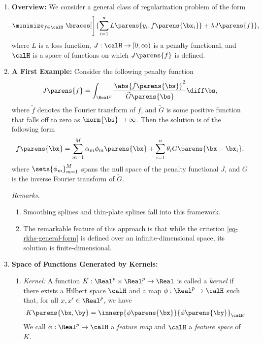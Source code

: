 \documentclass[12pt]{article}
\begin{document}
\begin{enumerate}[label=\textbf{\arabic*.}]

	\item \textbf{Overview:} We consider a general class of regularization problem of the form 
	\begin{align}\label{eq-rkhs-general-form}
		\minimize_{f \in \calH} \ \braces[\Bigg]{ \sum_{i=1}^n L \parens{y_i, f \parens{\bx_i} } + \lambda J \parens{f} }, 
	\end{align}
	where $L$ is a loss function, $J: \calH \to [0, \infty)$ is a penalty functional, and $\calH$ is a space of functions on which $J \parens{f}$ is defined. 
	
	\item \textbf{A First Example:} Consider the following penalty function 
	\begin{align*}
		J \parens{f} = \int_{\Real^p} \frac{\abs{\tilde{f} \parens{\bs}}^2}{\widetilde{G} \parens{\bs}} \diff \bs, 
	\end{align*}
	where $\tilde{f}$ denotes the Fourier transform of $f$, and $\widetilde{G}$ is some positive function that falls off to zero as $\norm{\bs} \to \infty$. Then the solution is of the following form 
	\begin{align*}
		f \parens{\bx} = \sum_{m=1}^M \alpha_m \phi_m \parens{\bx} + \sum_{i=1}^n \theta_i G \parens{\bx - \bx_i}, 
	\end{align*}
	where $\sets{\phi_m}_{m=1}^M$ spans the null space of the penalty functional $J$, and $G$ is the inverse Fourier transform of $\widetilde{G}$. 
	
	\textit{Remarks.} 
	\begin{enumerate}
		\item Smoothing splines and thin-plate splines fall into this framework. 
		\item The remarkable feature of this approach is that while the criterion \eqref{eq-rkhs-general-form} is defined over an infinite-dimensional space, its solution is finite-dimensional. 
	\end{enumerate}
	
	\item \textbf{Space of Functions Generated by Kernels:} 
	\begin{enumerate}
		\item \textit{Kernel:} A function $K: \Real^p \times \Real^p \to \Real$ is called a \textit{kernel} if there exists a Hilbert space $\calH$ and a map $\phi: \Real^p \to \calH$ such that, for all $x, x' \in \Real^p$, we have
		\begin{align*}
			K \parens{\bx, \by} = \innerp{\phi \parens{\bx}}{\phi \parens{\by}}_{\calH}. 
		\end{align*}
		We call $\phi: \Real^p \to \calH$ a \emph{feature map} and $\calH$ a \textit{feature space} of $K$. 
		

\end{enumerate}
\end{enumerate}
\end{document}
